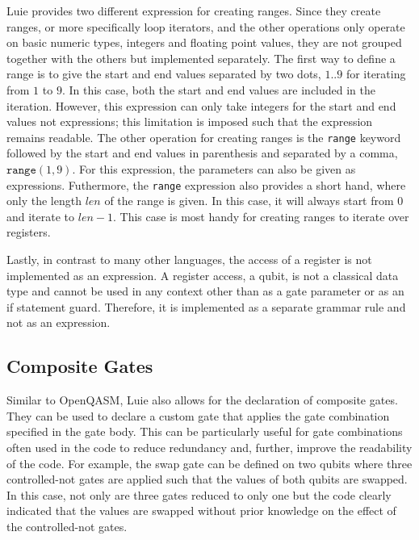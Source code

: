 Luie provides two different expression for creating ranges. Since they create ranges, or more specifically loop iterators, and the other operations only operate on basic numeric types, \eg integers and floating point values, they are not grouped together with the others but implemented separately. The first way to define a range is to give the start and end values separated by two dots, \eg $1\texttt{..}9$ for iterating from $1$ to $9$. In this case, both the start and end values are included in the iteration. However, this expression can only take integers for the start and end values not expressions; this limitation is imposed such that the expression remains readable. The other operation for creating ranges is the \texttt{range} keyword followed by the start and end values in parenthesis and separated by a comma, \eg $\texttt{range}(1, 9)$. For this expression, the parameters can also be given as expressions. Futhermore, the \texttt{range} expression also provides a short hand, where only the length $len$ of the range is given. In this case, it will always start from $0$ and iterate to $len - 1$. This case is most handy for creating ranges to iterate over registers. 

Lastly, in contrast to many other languages, the access of a register is not implemented as an expression. A register access, \ie a qubit, is not a classical data type and cannot be used in any context other than as a gate parameter or as an if statement guard. Therefore, it is implemented as a separate grammar rule and not as an expression.

\subsection{Composite Gates}
\label{sec:concept_compositeGates}
Similar to OpenQASM, Luie also allows for the declaration of composite gates. They can be used to declare a custom gate that applies the gate combination specified in the gate body. This can be particularly useful for gate combinations often used in the code to reduce redundancy and, further, improve the readability of the code. For example, the swap gate can be defined on two qubits where three controlled-not gates are applied such that the values of both qubits are swapped. In this case, not only are three gates reduced to only one but the code clearly indicated that the values are swapped without prior knowledge on the effect of the controlled-not gates.

